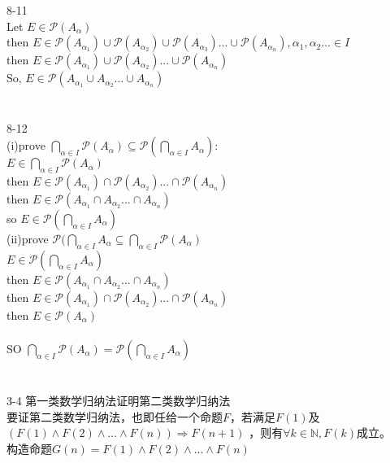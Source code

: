 \documentclass[a4paper, justified]{tufte-handout}
\begin{document}
\\
\\
8-11\\
Let $E \in \mathcal{P} (A_\alpha)$
\\then $E \in \mathcal{P} (A_{\alpha_1}) \cup \mathcal{P} (A_{\alpha_2}) \cup \mathcal{P} (A_{\alpha_3})...\cup\mathcal{P} (A_{\alpha_n}),\alpha_1, \alpha_2 ... \in I$\\
then $E \in \mathcal{P} (A_{\alpha_1})\cup \mathcal{P}(A_{\alpha_2})...\cup \mathcal{P}(A_{\alpha_n})$\\
So, $E \in \mathcal{P} (A_{\alpha_1}\cup A_{\alpha_2}...\cup A_{\alpha_n})$\\
\\
\\
8-12\\
(i)prove $\bigcap_{\alpha\in I}\mathcal{P} (A_\alpha) \subseteq \mathcal{P}(\bigcap_{\alpha\in I}A_\alpha):$\\
$E \in \bigcap_{\alpha\in I}\mathcal{P}(A_\alpha)$\\
then $E \in \mathcal{P} (A_{\alpha_1})\cap \mathcal{P}(A_{\alpha_2})...\cap \mathcal{P}(A_{\alpha_n})$\\
then $E \in \mathcal{P} (A_{\alpha_1}\cap A_{\alpha_2}...\cap A_{\alpha_n})$\\
so $E \in \mathcal{P}(\bigcap_{\alpha\in I}A_\alpha)$\\
(ii)prove $\mathcal{P}(\bigcap_{\alpha\in I}A_\alpha \subseteq \bigcap_{\alpha\in I}\mathcal{P} (A_\alpha) $\\
$E \in \mathcal{P} (\bigcap_{\alpha\in I}A_\alpha)$\\
then $E \in \mathcal{P} (A_{\alpha_1}\cap A_{\alpha_2}...\cap A_{\alpha_n})$\\
then $E \in \mathcal{P} (A_{\alpha_1})\cap \mathcal{P}(A_{\alpha_2})...\cap \mathcal{P}(A_{\alpha_n})$\\
then $E \in \mathcal{P} (A_\alpha) $\\
\\
SO $\bigcap_{\alpha\in I}\mathcal{P} (A_\alpha)   = \mathcal{P}(\bigcap_{\alpha\in I}A_\alpha)$\\
\\
\\
3-4
第一类数学归纳法证明第二类数学归纳法\\
要证第二类数学归纳法，也即任给一个命题$F$，若满足$F(1)$及$(F(1)\wedge F(2) \wedge ...\wedge F(n))\Rightarrow F(n + 1)$ ，则有$\forall k \in \mathbb{N} , F(k)$成立。\\
构造命题$G(n) = F(1)\wedge F(2) \wedge ...\wedge F(n)$\\
\end{document}
